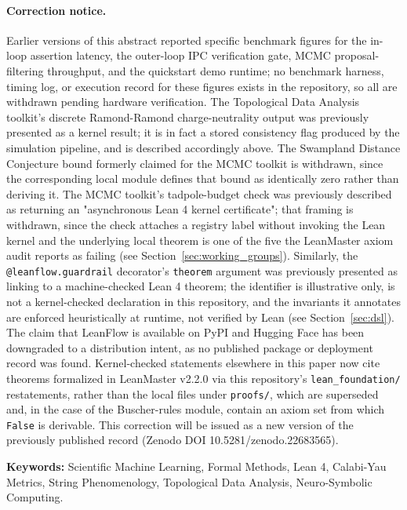 \documentclass[11pt,a4paper]{article}
\begin{document}
\paragraph{Correction notice.} Earlier versions of this abstract reported specific benchmark figures for the in-loop assertion latency, the outer-loop IPC verification gate, MCMC proposal-filtering throughput, and the quickstart demo runtime; no benchmark harness, timing log, or execution record for these figures exists in the repository, so all are withdrawn pending hardware verification. The Topological Data Analysis toolkit's discrete Ramond-Ramond charge-neutrality output was previously presented as a kernel result; it is in fact a stored consistency flag produced by the simulation pipeline, and is described accordingly above. The Swampland Distance Conjecture bound formerly claimed for the MCMC toolkit is withdrawn, since the corresponding local module defines that bound as identically zero rather than deriving it. The MCMC toolkit's tadpole-budget check was previously described as returning an "asynchronous Lean 4 kernel certificate"; that framing is withdrawn, since the check attaches a registry label without invoking the Lean kernel and the underlying local theorem is one of the five the LeanMaster axiom audit reports as failing (see Section~\ref{sec:working_groups}). Similarly, the \texttt{@leanflow.guardrail} decorator's \texttt{theorem} argument was previously presented as linking to a machine-checked Lean 4 theorem; the identifier is illustrative only, is not a kernel-checked declaration in this repository, and the invariants it annotates are enforced heuristically at runtime, not verified by Lean (see Section~\ref{sec:dsl}). The claim that LeanFlow is available on PyPI and Hugging Face has been downgraded to a distribution intent, as no published package or deployment record was found. Kernel-checked statements elsewhere in this paper now cite theorems formalized in LeanMaster v2.2.0 via this repository's \texttt{lean\_foundation/} restatements, rather than the local files under \texttt{proofs/}, which are superseded and, in the case of the Buscher-rules module, contain an axiom set from which \texttt{False} is derivable. This correction will be issued as a new version of the previously published record (Zenodo DOI 10.5281/zenodo.22683565).

\vspace{0.5em}
\noindent\textbf{Keywords:} Scientific Machine Learning, Formal Methods, Lean 4, Calabi-Yau Metrics, String Phenomenology, Topological Data Analysis, Neuro-Symbolic Computing.
\end{document}
